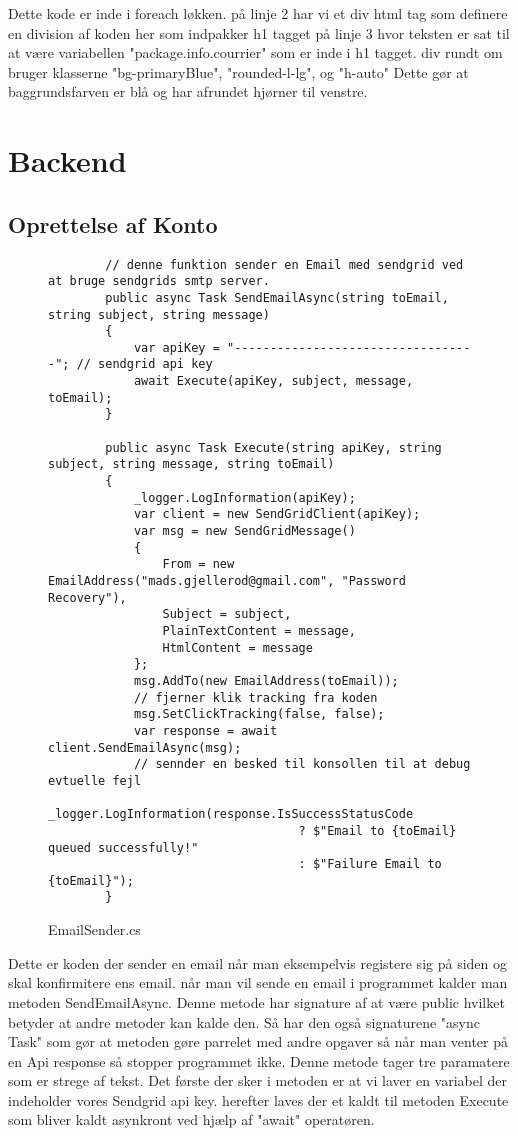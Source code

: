 Dette kode er inde i foreach løkken. på linje 2 har vi et div html tag som definere en division af koden
her  som indpakker h1 tagget på linje 3 hvor teksten er sat til at være variabellen "package.info.courrier" som er 
inde i h1 tagget. div rundt om bruger klasserne "bg-primaryBlue", "rounded-l-lg", og "h-auto" Dette gør at baggrundsfarven er blå
og har afrundet hjørner til venstre.


\section{Backend}
\subsection{Oprettelse af Konto}
\newpage
\begin{figure}[!ht]
    \begin{verbatim}
        // denne funktion sender en Email med sendgrid ved at bruge sendgrids smtp server.
        public async Task SendEmailAsync(string toEmail, string subject, string message)
        {
            var apiKey = "----------------------------------"; // sendgrid api key
            await Execute(apiKey, subject, message, toEmail);
        }
    
        public async Task Execute(string apiKey, string subject, string message, string toEmail)
        {
            _logger.LogInformation(apiKey);
            var client = new SendGridClient(apiKey);
            var msg = new SendGridMessage()
            {
                From = new EmailAddress("mads.gjellerod@gmail.com", "Password Recovery"),
                Subject = subject,
                PlainTextContent = message,
                HtmlContent = message
            };
            msg.AddTo(new EmailAddress(toEmail));
            // fjerner klik tracking fra koden 
            msg.SetClickTracking(false, false);
            var response = await client.SendEmailAsync(msg);
            // sennder en besked til konsollen til at debug evtuelle fejl
            _logger.LogInformation(response.IsSuccessStatusCode
                                   ? $"Email to {toEmail} queued successfully!"
                                   : $"Failure Email to {toEmail}");
        }
    \end{verbatim}
\caption{EmailSender.cs}\label{code:EmailSender.cs}
\end{figure}

Dette er koden der sender en email når man eksempelvis registere sig på siden og skal 
konfirmitere ens email. når man vil sende en email i programmet kalder man metoden SendEmailAsync.
Denne metode har signature af at være public hvilket betyder at andre metoder kan kalde den. Så har
den også signaturene "async Task" som gør at metoden gøre parrelet med andre opgaver så når man venter på
en Api response så stopper programmet ikke. Denne metode tager tre paramatere som er strege af tekst.
Det første der sker i metoden er at vi laver en variabel der indeholder vores Sendgrid api key.
herefter laves der et kaldt til metoden Execute som bliver kaldt asynkront ved hjælp af "await" operatøren.

